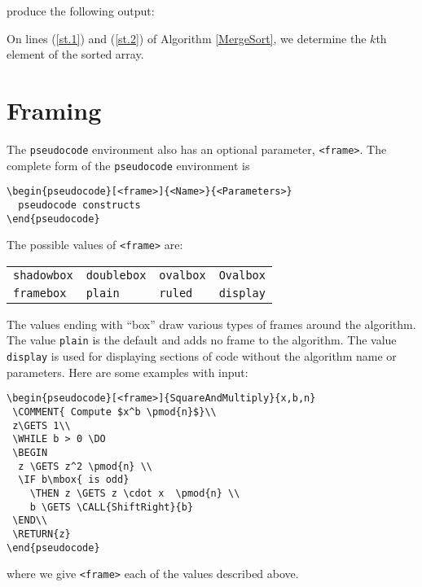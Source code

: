 \documentclass{article}
\newcommand{\keyword}[1]{\texttt{#1}}
\begin{document}
\noindent{}produce the following output:

\medskip 

\noindent{}On lines (\ref{st.1}) and (\ref{st.2}) of Algorithm \ref{MergeSort},  
we determine the $k$th element of the 
sorted array.




\section{Framing}
The \keyword{pseudocode} environment also has an optional parameter, 
\verb+<frame>+. The complete form of the \keyword{pseudocode} environment is

\begin{verbatim}
\begin{pseudocode}[<frame>]{<Name>}{<Parameters>}
  pseudocode constructs
\end{pseudocode}
\end{verbatim}

The possible values of  \verb+<frame>+ are:
\begin{center}
\begin{tabular}{llll}
\verb+shadowbox+ &
\verb+doublebox+ &
\verb+ovalbox+ &
\verb+Ovalbox+  \\
\verb+framebox+ &
\verb+plain+ &
\verb+ruled+ &
\verb+display+
\end{tabular}
\end{center}
The values ending with ``box'' draw various types of frames around the algorithm.
The value \verb+plain+ is the default and adds no frame to the algorithm.
The value \verb+display+ is used for displaying sections of code
without the algorithm name or parameters. Here are some examples with
input:

\begin{verbatim}
\begin{pseudocode}[<frame>]{SquareAndMultiply}{x,b,n}
 \COMMENT{ Compute $x^b \pmod{n}$}\\
 z\GETS 1\\
 \WHILE b > 0 \DO
 \BEGIN
  z \GETS z^2 \pmod{n} \\
  \IF b\mbox{ is odd} 
    \THEN z \GETS z \cdot x  \pmod{n} \\
    b \GETS \CALL{ShiftRight}{b}
 \END\\
 \RETURN{z}
\end{pseudocode}
\end{verbatim}

\noindent{}where we give \verb+<frame>+  each of the values described above.
\end{document}
